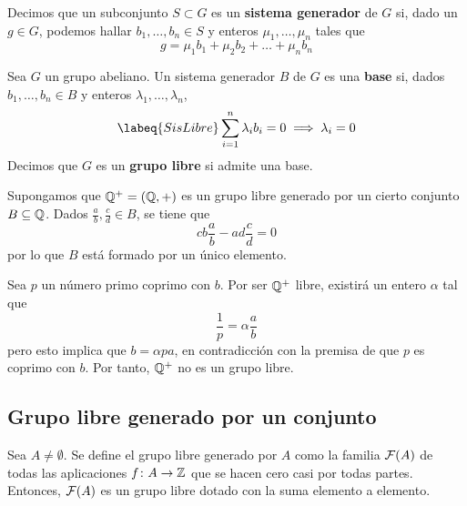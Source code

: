 Decimos que un subconjunto $S \subset G$ es un \textbf{sistema generador} de $G$
si, dado un $g \in G$, podemos hallar $b_1,\dots,b_n \in S$ y enteros
$\mu_1,\dots,\mu_n$ tales que
\[g=\mu_1b_1+\mu_2b_2+\dots+\mu_nb_n\]

\begin{definition}
Sea $G$ un grupo abeliano. Un sistema generador $B$ de $G$ es una \textbf{base}
si, dados $b_1,\dots,b_n \in B$ y enteros $\lambda_1,\dots,\lambda_n$,
\begin{align}
\labeq{SisLibre} \sum^n_{i=1}\lambda_ib_i=0 \implies \lambda_i=0
\end{align}
Decimos que $G$ es un \textbf{grupo libre} si admite una base.
\end{definition}

\begin{example}
Supongamos que $\mathbb{Q}^+=(\mathbb{Q},+)$ es un grupo libre generado por un cierto
conjunto $B \subseteq \mathbb{Q}$. Dados $\frac{a}{b}, \frac{c}{d} \in B$, se tiene
que
\[cb\frac{a}{b}-ad\frac{c}{d}=0\]
por lo que $B$ está formado por un único elemento.

Sea $p$ un número primo coprimo con $b$. Por ser $\mathbb{Q}^+$ libre, existirá un
entero $\alpha$ tal que
\[\frac{1}{p}=\alpha\frac{a}{b}\]
pero esto implica que $b=\alpha pa$, en contradicción con la premisa de que $p$
es coprimo con $b$. Por tanto, $\mathbb{Q}^+$ no es un grupo libre.
\end{example}

\subsection{Grupo libre generado por un conjunto}
\begin{proposition}
Sea $A \neq\emptyset$. Se define el grupo libre generado por $A$ como la familia
$\mathcal{F}(A)$ de todas las aplicaciones $f\colon A \to \mathbb{Z}$ que se
hacen cero casi por todas partes. Entonces, $\mathcal{F}(A)$ es un grupo libre dotado
con la suma elemento a elemento.
\end{proposition}


